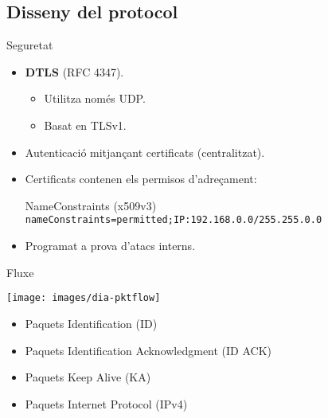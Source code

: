 \subsection{Disseny del protocol}
    \begin{frame}{Seguretat}
        \begin{itemize}
\item \textbf{DTLS} (RFC 4347).
        \begin{itemize}
            \item Utilitza només UDP.
            \item Basat en TLSv1.
        \end{itemize}
\item Autenticació mitjançant certificats (centralitzat).
\item Certificats contenen els permisos d'adreçament:
        \begin{block}{NameConstraints (x509v3)}\small\tt
        nameConstraints=permitted;IP:192.168.0.0/255.255.0.0
        \end{block}
\item Programat a prova d'atacs interns.
        \end{itemize}
    \end{frame}
    \begin{frame}{Fluxe}
        \begin{center}
        \texttt{[image: images/dia-pktflow]}
        \end{center}
        \begin{itemize}
\item Paquets Identification (ID)
\item Paquets Identification Acknowledgment (ID ACK)
\item Paquets Keep Alive (KA)
\item Paquets Internet Protocol (IPv4)
        \end{itemize}

    \end{frame}
